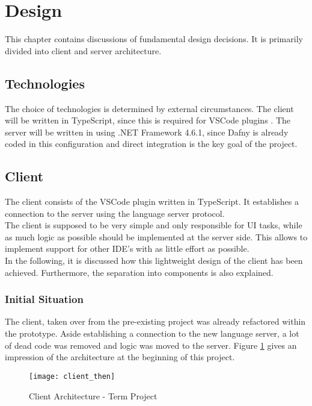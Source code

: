 \section{Design}
This chapter contains discussions of fundamental design decisions.
It is primarily divided into client and server architecture.

\subsection{Technologies}
The choice of technologies is determined by external circumstances.
The client will be written in TypeScript, since this is required for VSCode plugins \cite{vscodeAPI}.
The server will be written in \CsharpWithSpace using .NET Framework 4.6.1, since Dafny is already coded in this configuration and direct integration is the key goal of the project.


\subsection{Client}
The client consists of the VSCode plugin written in TypeScript.
It establishes a connection to the server using the language server protocol.\\

The client is supposed to be very simple and only responsible for UI tasks, while as much logic as possible should be implemented at the server side.
This allows to implement support for other IDE's with as little effort as possible.\\

In the following, it is discussed how this lightweight design of the client has been achieved.
Furthermore, the separation into components is also explained.

\subsubsection{Initial Situation}
The client, taken over from the pre-existing project was already refactored within the prototype.
Aside establishing a connection to the new language server, a lot of dead code was removed and logic was moved to the server.
Figure \ref{fig:client_then} gives an impression of the architecture at the beginning of this project.

\begin{figure}[H]
    \centering
    \texttt{[image: client\_then]}
    \caption{Client Architecture - Term Project}
    \label{fig:client_then}
\end{figure}

